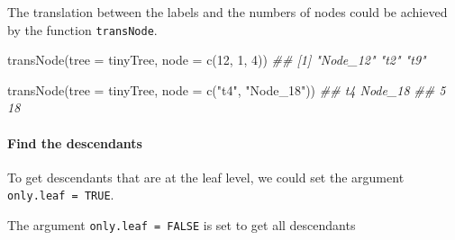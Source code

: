 \documentclass[]{article}
\newcommand{\hlnum}[1]{\textcolor[rgb]{0.816,0.125,0.439}{#1}}%
\newcommand{\hlstr}[1]{\textcolor[rgb]{0.251,0.627,0.251}{#1}}%
\newcommand{\hlcom}[1]{\textcolor[rgb]{0.502,0.502,0.502}{\textit{#1}}}%
\newcommand{\hlstd}[1]{\textcolor[rgb]{0.251,0.251,0.251}{#1}}%
\newcommand{\hlkwc}[1]{\textcolor[rgb]{0.251,0.251,0.251}{#1}}%
\newcommand{\hlkwd}[1]{\textcolor[rgb]{0.878,0.439,0.125}{#1}}%
\newenvironment{Shaded}{\begin{myshaded}}{\end{myshaded}}
\newcommand{\KeywordTok}[1]{\hlkwd{#1}}
\newcommand{\DataTypeTok}[1]{\hlkwc{#1}}
\newcommand{\DecValTok}[1]{\hlnum{#1}}
\newcommand{\StringTok}[1]{\hlstr{#1}}
\newcommand{\CommentTok}[1]{\hlcom{#1}}
\newcommand{\OtherTok}[1]{{#1}}
\newcommand{\NormalTok}[1]{\hlstd{#1}}
\begin{document}
The translation between the labels and the numbers of nodes could be achieved by
the function \texttt{transNode}.

\begin{Shaded}
\begin{Highlighting}[]
\KeywordTok{transNode}\NormalTok{(}\DataTypeTok{tree =}\NormalTok{ tinyTree, }\DataTypeTok{node =} \KeywordTok{c}\NormalTok{(}\DecValTok{12}\NormalTok{, }\DecValTok{1}\NormalTok{, }\DecValTok{4}\NormalTok{))}
\CommentTok{## [1] "Node_12" "t2"      "t9"}
\end{Highlighting}
\end{Shaded}

\begin{Shaded}
\begin{Highlighting}[]
\KeywordTok{transNode}\NormalTok{(}\DataTypeTok{tree =}\NormalTok{ tinyTree, }\DataTypeTok{node =} \KeywordTok{c}\NormalTok{(}\StringTok{"t4"}\NormalTok{, }\StringTok{"Node_18"}\NormalTok{))}
\CommentTok{##      t4 Node_18 }
\CommentTok{##       5      18}
\end{Highlighting}
\end{Shaded}

\hypertarget{find-the-descendants}{%
\paragraph{Find the descendants}\label{find-the-descendants}}

To get descendants that are at the leaf level, we could set the argument
\texttt{only.leaf = TRUE}.

\begin{Shaded}
\end{Shaded}

The argument \texttt{only.leaf = FALSE} is set to get all descendants

\begin{Shaded}
\end{Shaded}
\end{document}
